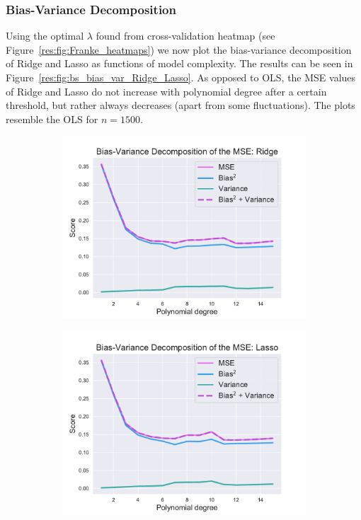 \documentclass[twocolumn,english,notitlepage]{article}
\begin{document}
        \subsubsection{Bias-Variance Decomposition}
            Using the optimal $\lambda$ found from cross-validation heatmap (see Figure~\ref{res:fig:Franke_heatmaps}) we now plot the bias-variance decomposition of Ridge and Lasso as functions of model complexity. The results can be seen in Figure~\ref{res:fig:bs_bias_var_Ridge_Lasso}. As opposed to OLS, the MSE values of Ridge and Lasso do not increase with polynomial degree after a certain threshold, but rather always decreases (apart from some fluctuations). The plots resemble the OLS for $n=1500$. 

            \begin{figure}[ht]
                \begin{subfigure}{\linewidth}
                    \centering
                    \includegraphics[width=\linewidth]{BS_Bias_var_decomp_Ridge.pdf}
                \end{subfigure}
                \begin{subfigure}{\linewidth}
                    \centering
                    \includegraphics[width=\linewidth]{BS_Bias_var_decomp_Lasso.pdf}

\end{subfigure}
\end{figure}
\end{document}
